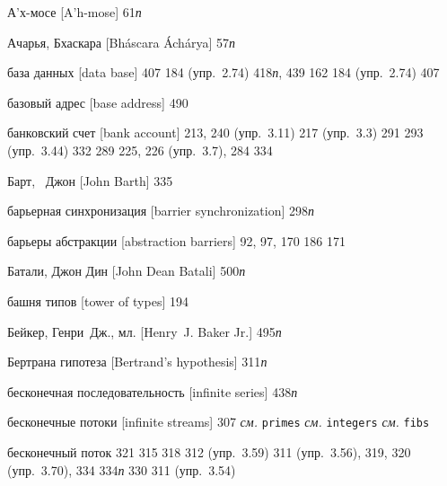\begin{theindex}
\item {А'х-мосе [A'h-mose]} 61{\it п}
\item {Ачарья, Бхаскара [Bh\'ascara \'Ach\'arya]} 57{\it п}
\bigskip
\item {база данных [data base]}
   407
   184 (упр.~2.74)
   418{\it п}, 439
   162
   184 (упр.~2.74)
   407
\item {базовый адрес [base address]} 490
\item {банковский счет [bank account]} 213, 240 (упр.~3.11)
   217 (упр.~3.3)
   291
   293 (упр.~3.44)
   332
   289
   225, 226 (упр.~3.7), 284
   334
\item {Барт,~ Джон [John Barth]} 335
\item {барьерная синхронизация [barrier synchronization]} 298{\it п}
\item {барьеры абстракции [abstraction barriers]} 92, 97, 170
   186
   171
\item {Батали, Джон Дин [John Dean Batali]} 500{\it п}
\item {башня типов [tower of types]} 194
\item {Бейкер, Генри~Дж., мл. [Henry~J. Baker Jr.]} 495{\it п}
\item {Бертрана гипотеза [Bertrand's hypothesis]} 311{\it п}
\item {бесконечная последовательность [infinite series]} 438{\it п}
\item {бесконечные потоки [infinite streams]} 307
   {\it см.} \texttt{primes}
   {\it см.} \texttt{integers}
   {\it см.} \texttt{fibs}
\item {бесконечный поток}
   321
   315
   318
   312 (упр.~3.59)
   311 (упр.~3.56), 319, 320 (упр.~3.70), 334
   334{\it п}
   330
   311 (упр.~3.54)

\end{theindex}

